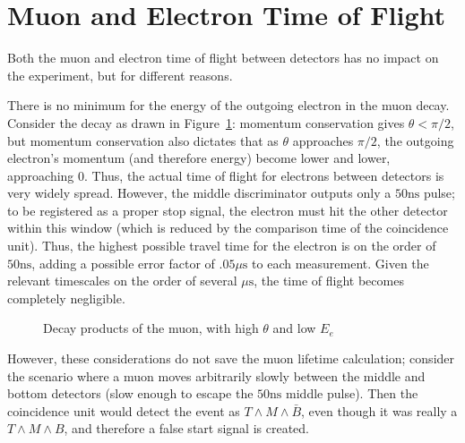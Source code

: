 \section{Muon and Electron Time of Flight}
\label{timeofflight}

Both the muon and electron time of flight between detectors has no impact on the experiment, but for different reasons.

There is no minimum for the energy of the outgoing electron in the muon decay. Consider the decay as drawn in Figure~\ref{figure:electronpi}: momentum conservation gives $\theta < \pi/2$, but momentum conservation also dictates that as $\theta$ approaches $\pi/2$, the outgoing electron's momentum (and therefore energy) become lower and lower, approaching $0$. Thus, the actual time of flight for electrons between detectors is very widely spread. However, the middle discriminator outputs only a $50 \mathrm{ns}$ pulse; to be registered as a proper stop signal, the electron must hit the other detector within this window (which is reduced by the comparison time of the coincidence unit). Thus, the highest possible travel time for the electron is on the order of $50 \mathrm{ns}$, adding a possible error factor of $.05 \mu\mathrm{s}$ to each measurement. Given the relevant timescales on the order of several $\mu\mathrm{s}$, the time of flight becomes completely negligible.

\begin{figure}[htbp]
\begin{center}
 

 
\caption{\small{Decay products of the muon, with high $\theta$ and low $E_{e}$}}
\label{figure:electronpi}
\end{center}
\end{figure}

However, these considerations do not save the muon lifetime calculation; consider the scenario where a muon moves arbitrarily slowly between the middle and bottom detectors (slow enough to escape the $50 \mathrm{ns}$ middle pulse). Then the coincidence unit would detect the event as $T \wedge M \wedge \bar{B}$, even though it was really a $T \wedge M \wedge B$, and therefore a false start signal is created.

